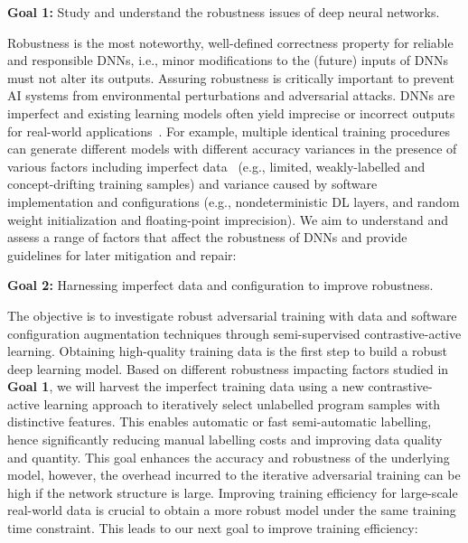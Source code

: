 \begin{formal}\noindent
{\bf Goal 1:} Study and understand the robustness issues of deep neural networks.\label{goal1}
\end{formal}
\noindent
Robustness is the most noteworthy, well-defined correctness property for reliable and responsible DNNs, i.e., minor modifications to the (future) inputs of DNNs must not alter its outputs. Assuring robustness is critically important to prevent AI systems from environmental perturbations and adversarial attacks.
DNNs are imperfect and existing learning models often yield imprecise or incorrect outputs for real-world applications~\cite{pham2020problems,xiao2021nondeterministic}. 
For example, multiple identical training procedures can generate different models with different accuracy variances in the presence of various factors including imperfect data~\cite{zhang2019familial,menzies2012promise,shu2020omni} (e.g., limited, weakly-labelled and concept-drifting training samples) and variance caused by software implementation and configurations  (e.g., nondeterministic DL layers, and random weight initialization and floating-point imprecision). 
We aim to understand and assess a range of factors that affect the robustness of DNNs and provide guidelines for later mitigation and repair: 

\begin{formal}\noindent
{\bf Goal 2:} Harnessing imperfect data and configuration to improve robustness.
\end{formal}
\noindent
The objective is to investigate robust adversarial training with data and software configuration augmentation techniques through semi-supervised contrastive-active learning. 
Obtaining high-quality training data is the first step to build a robust deep learning model. Based on different robustness impacting factors studied in \textbf{Goal 1}, we will harvest the imperfect training data using a new contrastive-active learning approach to iteratively select unlabelled program samples with distinctive features. This enables automatic or fast semi-automatic labelling, hence significantly reducing
manual labelling costs and improving data quality and quantity. This goal enhances the accuracy and robustness of the underlying model, however, the overhead incurred to the iterative adversarial training can be high if the network structure is large. Improving training efficiency for large-scale real-world data is crucial to obtain a more robust model under the same training time constraint. This leads to our next goal to improve training efficiency:

